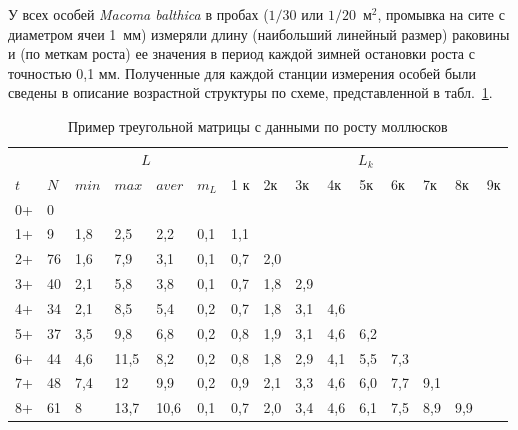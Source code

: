 У всех особей {\it Macoma balthica} в пробах ($1/30$ или $1/20$~м$^2$, промывка на сите с диаметром ячеи 1~мм) измеряли длину (наибольший линейный размер) раковины и (по меткам роста) ее значения в период каждой зимней остановки роста с точностью 0,1 мм.
Полученные для каждой станции измерения особей были сведены в описание возрастной структуры по схеме, представленной в табл.~\ref{tab:rost_matrica_primer}. 
\begin{table}[h]
        \caption{Пример треугольной матрицы с данными по росту моллюсков}
        \label{tab:rost_matrica_primer}
        \begin{tabularx}{\textwidth}{|X|X|XX|XX|XXXXXXXXX|}
        \hline
        &    & \multicolumn{4}{c|}{$L$}               & \multicolumn{9}{c|}{$L_{k}$} \\ 
        $t$     & $N$  & $min$ & $max$ & $aver$ & $m_{L}$   & 1 к & 2к  & 3к  & 4к  & 5к  & 6к  & 7к  & 8к   & 9к   \\ \hline
        0+      & 0  &       &       &         &         &     &     &     &     &     &     &     &      &      \\
        1+      & 9  & 1,8   & 2,5   & 2,2     & 0,1     & 1,1 &     &     &     &     &     &     &      &      \\
        2+      & 76 & 1,6   & 7,9   & 3,1     & 0,1     &\cellcolor{yellow}0,7 & \cellcolor{yellow}2,0 &     &     &     &     &     &      &      \\
        3+      & 40 & 2,1   & 5,8   & 3,8     & 0,1     & 0,7 & 1,8 & 2,9 &     &     &     &     &      &      \\
        4+      & 34 & 2,1   & 8,5   & 5,4     & 0,2     & 0,7 & 1,8 & 3,1 & 4,6 &     &     &     &      &      \\
        5+      & 37 & 3,5   & 9,8   & 6,8     & 0,2     & 0,8 & 1,9 & 3,1 & 4,6 & 6,2 &     &     &      &      \\
        6+      & 44 & 4,6   & 11,5  & 8,2     & 0,2     & 0,8 & 1,8 & 2,9 & 4,1 & 5,5 & 7,3 &     &      &      \\
        7+      & 48 & 7,4   & 12    & 9,9     & 0,2     & 0,9 & 2,1 & 3,3 & 4,6 & 6,0 & 7,7 & 9,1 &      &      \\
        8+      & 61 & 8     & 13,7  & 10,6    & 0,1     & \cellcolor{red}0,7 & \cellcolor{red}2,0 & \cellcolor{red}3,4 & \cellcolor{red}4,6 & \cellcolor{red}6,1 & \cellcolor{red}7,5 & \cellcolor{red}8,9 & \cellcolor{red}9,9  &      \\

\end{tabularx}
\end{table}
